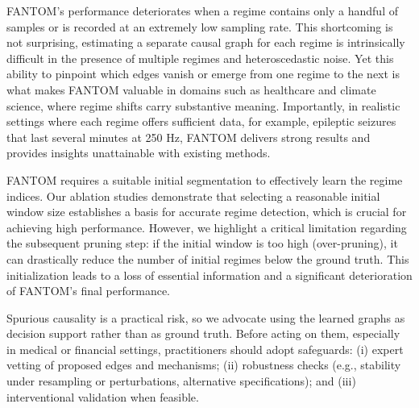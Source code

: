 FANTOM’s performance deteriorates when a regime contains only a handful of samples or is recorded at an extremely low sampling rate. This shortcoming is not surprising, estimating a separate causal graph for each regime is intrinsically difficult in the presence of multiple regimes and heteroscedastic noise. Yet this ability to pinpoint which edges vanish or emerge from one regime to the next is what makes FANTOM valuable in domains such as healthcare and climate science, where regime shifts carry substantive meaning. Importantly, in realistic settings where each regime offers sufficient data, for example, epileptic seizures that last several minutes at 250 Hz, FANTOM delivers strong  results and provides insights unattainable with existing methods.

FANTOM requires a suitable initial segmentation to effectively learn the regime indices. Our ablation studies demonstrate that selecting a reasonable initial window size establishes a basis for accurate regime detection, which is crucial for achieving high performance. However, we highlight a critical limitation regarding the subsequent pruning step: if the initial window is too high (over-pruning), it can drastically reduce the number of initial regimes below the ground truth. This initialization leads to a loss of essential information and a significant deterioration of FANTOM’s final performance.

Spurious causality is a practical risk, so we advocate using the learned graphs as decision support rather than as ground truth. Before acting on them, especially in medical or financial settings, practitioners should adopt safeguards: (i) expert vetting of proposed edges and mechanisms; (ii) robustness checks (e.g., stability under resampling or perturbations, alternative specifications); and (iii) interventional validation when feasible.